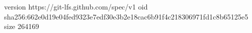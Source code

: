 version https://git-lfs.github.com/spec/v1
oid sha256:662e0d19e04fed9323e7edf30e3b2e18cac6b91f4c218306971fd1c8b65125e5
size 264169
